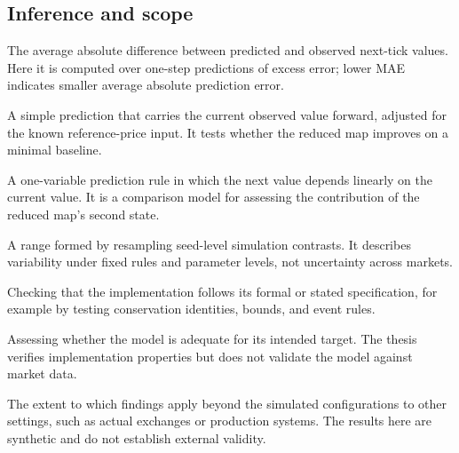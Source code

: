 \subsection*{Inference and scope}
\begin{description}[style=unboxed,leftmargin=0pt,labelwidth=0pt,labelsep=0.5em,itemsep=0.1em]
  \item[MAE --- mean absolute error:] The average absolute difference between predicted and observed next-tick values. Here it is computed over one-step predictions of excess error; lower MAE indicates smaller average absolute prediction error.
  \item[Persistence benchmark:] A simple prediction that carries the current observed value forward, adjusted for the known reference-price input. It tests whether the reduced map improves on a minimal baseline.
  \item[Scalar autoregression:] A one-variable prediction rule in which the next value depends linearly on the current value. It is a comparison model for assessing the contribution of the reduced map's second state.
  \item[Monte Carlo interval:] A range formed by resampling seed-level simulation contrasts. It describes variability under fixed rules and parameter levels, not uncertainty across markets.
  \item[Verification:] Checking that the implementation follows its formal or stated specification, for example by testing conservation identities, bounds, and event rules.
  \item[Validation:] Assessing whether the model is adequate for its intended target. The thesis verifies implementation properties but does not validate the model against market data.
  \item[External validity:] The extent to which findings apply beyond the simulated configurations to other settings, such as actual exchanges or production systems. The results here are synthetic and do not establish external validity.
\end{description}
\endgroup
